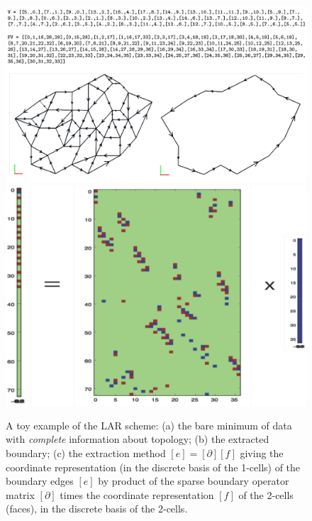 \begin{figure}[!htbp] %
 \centering
 \includegraphics[width=0.5\linewidth]{images/minimum-colors-test} 
 \hfill
 \includegraphics[width=0.4\linewidth]{images/boundary} 
 \caption{A toy example of the LAR scheme: (a) the bare minimum of data with \emph{complete} information about topology; (b) the extracted boundary; (c) the extraction method $[e] = [\partial][f]$ giving the coordinate representation (in the discrete basis of the 1-cells) of the boundary edges $[e]$ by product of the sparse boundary operator matrix $[\partial]$ times the coordinate representation $[f]$ of the 2-cells (faces), in the discrete basis of the 2-cells.}
 \label{fig:minimum}
\end{figure}


 
